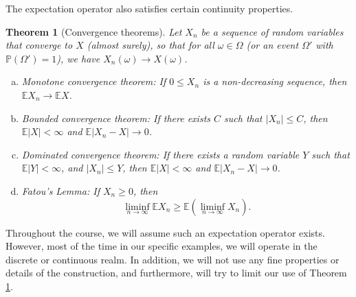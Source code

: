\documentclass[12pt, reqno]{amsart}
\newtheorem{theorem}{Theorem}
\renewcommand{\P}{{\mathbb P}}  %
\newcommand{\E}{{\mathbb E}}     %
\begin{document}
The expectation operator also  satisfies certain continuity properties.
\begin{theorem}[Convergence theorems]
\label{DOM}
Let $X_n$ be a  sequence  of random variables that converge to $X$ (almost surely), so that for all $\omega \in \Omega$ (or an event $\Omega'$ with $\P(\Omega') =1$), we have $X_n(\omega) \to X(\omega)$.  
\begin{enumerate}[(a)]
\item
Monotone convergence theorem:  If $0 \leq X_n $ is a non-decreasing sequence, then $\E X_n \to \E X$.
\item
Bounded convergence theorem:  If there exists $C$ such that $|X_n| \leq C$, then $\E |X| < \infty$ and  $\E |X_n -X| \to 0$.  
\item
Dominated convergence theorem:  If there exists a random variable $Y$ such that $\E|Y| < \infty$, and $|X_n| \leq Y$, then $\E |X| < \infty$ and  $\E|X_n - X| \to 0$.
\item
Fatou's Lemma: If $X_n \geq 0$, then $$\liminf_{n \to \infty} \E X_n \geq \E (\liminf_{n \to \infty} X_n).$$  
\end{enumerate}
\end{theorem}

Throughout the course, we will assume such an expectation operator exists.  However, most of the time in our specific examples, we will operate in the discrete or continuous realm.  In addition, we will not use any fine properties or details of the construction, and furthermore, will try to  limit our use of Theorem \ref{DOM}.
\end{document}
